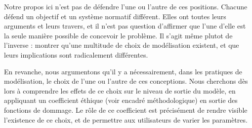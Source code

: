 Notre propos ici n'est pas de défendre l'une ou l'autre de ces positions. Chacune défend un objectif et un système normatif différent. Elles ont toutes leurs arguments et leurs travers, et il n'est pas question d'affirmer que l'une d'elle est la seule manière possible de concevoir le problème. Il s'agit même plutot de l'inverse : montrer qu'une multitude de choix de modélisation existent, et que leurs implications sont radicalement différentes. 

En revanche, nous argumentons qu'il y a nécessairement, dans les pratiques de modélisation, le choix de l'une ou l'autre de ces conceptions.  Nous cherchons dès lors à comprendre les effets de ce choix sur le niveau de sortie du modèle, en appliquant un coefficient éthique (voir encadré méthodologique) en sortie des fonctions de dommage. Le rôle de ce coefficient est précisément de  rendre visible l'existence de ce choix, et de permettre aux utilisateurs de varier les paramètres. 

